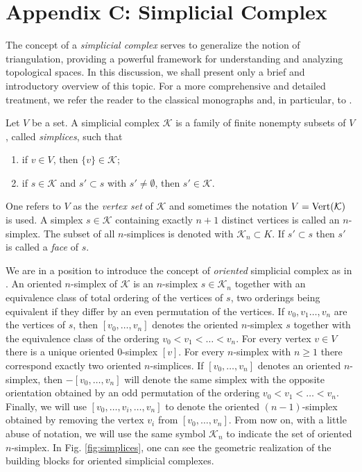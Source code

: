 \documentclass[a4paper,12pt,twoside,reqno]{amsart}
\theoremstyle{plain}
\theoremstyle{definition}
\theoremstyle{remark}
\numberwithin{equation}{section}
\numberwithin{figure}{section}
\numberwithin{table}{section}
\newcommand{\f}[1]{\mathcal{#1}}
\begin{document}
	
	
	
	\section{Appendix C: Simplicial Complex}\label{sec:simplicial_complex}
	
	
	
	
	The concept of a \emph{simplicial complex} serves to generalize the notion of triangulation, providing a powerful framework for understanding and analyzing topological spaces. In this discussion, we shall present only a brief and introductory overview of this topic. For a more comprehensive and detailed treatment, we refer the reader to the classical monographs \cite{Hatcher,Rotman} and, in particular, to \cite[Section 3.1]{spanier}.
	
	
	\medskip
	
	
	Let ${V}$ be a set. A  {simplicial complex} $\f{K}$ is a family of finite nonempty subsets of ${V}$, called \emph{simplices}, such that
	\begin{enumerate}
		\item if $v\in V$, then $\{v\}\in \f{K}$;
		\item if $s\in \f{K}$ and $s'\subset s$ with $s'\neq\emptyset$, then $s'\in \f{K}$.
	\end{enumerate}
	One refers to  $V$ as the \emph{vertex set} of $\f{K}$ and sometimes the notation $V= {\rm Vert}(\f{K})$ is used. A simplex $s\in \f{K}$ containing exactly $n+1$ distinct vertices is called an $n$-simplex. The subset of all $n$-simplices is denoted with $\f{K}_n\subset K$.
	If $s'\subset s$ then $s'$ is called a \emph{face} of $s$.
	
	\medskip
	
	
	We are in a position to introduce the concept of 	\emph{oriented} simplicial complex
	as in 	\cite[Section 4.1]{spanier}. An oriented $n$-simplex of $\f{K}$ is an $n$-simplex $s\in \f{K}_n$ together with an equivalence class of total ordering of the vertices of $s$, two orderings being equivalent if they differ by an even permutation of the vertices.
	If $v_0,v_1\ldots,v_n$	are the vertices of $s$, then $[v_0,\dots,v_n]$ denotes the oriented 
	$n$-simplex $s$ together with the equivalence class of the ordering 
	$v_0<v_1<\ldots<v_n$. For every vertex $v\in V$ there is a unique oriented 0-simplex $[v]$. For every $n$-simplex with $n\geqslant 1$ there correspond exactly two oriented 
	$n$-simplices. If  $[v_0,\dots,v_n]$ denotes an oriented $n$-simplex, then $-[v_0,\dots,v_n]$ will denote the same 	simplex with the opposite orientation obtained by an odd permutation  of the ordering 
	$v_0<v_1<\ldots<v_n$. Finally, we will use   $[v_0,\dots,\hat{v}_i,\dots,v_n]$ to denote
	the oriented $(n-1)$-simplex obtained by removing the vertex $v_i$ from $[v_0,\dots,v_n]$.  From now on, with a little abuse of notation, we will use the same symbol $\f{K}_n$ to indicate the set of oriented $n$-simplex. 
	In Fig. \ref{fig:simplices}, one can see the geometric realization of the building blocks for {oriented} simplicial complexes. 
	
\end{document}

